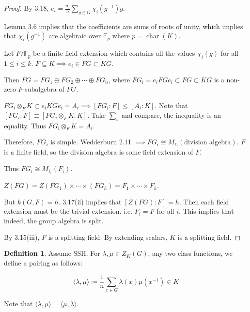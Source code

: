 \documentclass{article}
\theoremstyle{definition}
\newtheorem*{definition}{Definition}
\theoremstyle{plain}
\theoremstyle{remark}
\begin{document}
    \begin{proof}
        By 3.18, \(e_i = \frac{n_i}{n} \sum_{g\in G} \chi_i(g ^{-1}) g\).

        Lemma 3.6 implies that the coefficients are sums of roots of unity, which implies that \(\chi_i(g ^{-1})\) are algebraic over \(\mathbb{F}_p\) where \(p = \operatorname{char}(K)\).
        
        Let \(F / \mathbb{F}_p\) be a finite field extension which contains all the values \(\chi_i(g)\) for all \(1 \leq i \leq k\). \(F \subseteq K \implies e_i \in FG \subset KG\).

        Then \(FG = FG_1 \oplus FG_2 \oplus \cdots \oplus FG_n\), where \(FG_i = e_i FGe_i \subset FG \subset KG\) is a non-zero \(F\)-subalgebra of \(FG\).

        \(FG_i \otimes_F K \subset e_i KG e_i = A_i \implies [FG_i : F] \leq [A_i : K]\). Note that \([FG_i : F] \equiv  [FG_i \otimes_F K : K]\). Take \(\sum_{i}\) and compare, the inequality is an equality. Thus \(FG_i \otimes_F K = A_i\).
        
        Therefore, \(FG_i\) is simple. Wedderburn 2.11 \(\implies FG_i \cong M_{\ell_i}(\text{division algebra})\). \(F\) is a finite field, so the division algebra is some field extension of \(F\).

        Thus \(FG_i \cong M_{\ell_i}(F_i)\).

        \(Z(FG) = Z(FG_1) \times \cdots \times (FG_h) = F_1 \times \cdots \times F_h\).

        But \(k(G,F) = h\). 3.17(ii) implies that \([Z(FG):F] = h\). Then each field extension must be the trivial extension. i.e. \(F_i = F\) for all \(i\). This implies that indeed, the group algebra is split.

        By 3.15(iii), \(F\) is a splitting field. By extending scalars, \(K\) is a splitting field.
    \end{proof}

    \begin{definition}
        Assume SSH. For \(\lambda , \mu \in Z_K(G)\), any two class functions, we define a pairing as follows:

        \[
            \langle \lambda , \mu \rangle \coloneqq \frac{1}{n} \sum_{x\in G} \lambda(x) \mu(x ^{-1}) \in K
        \]

        Note that \(\langle \lambda , \mu \rangle = \langle \mu , \lambda \rangle \).
    \end{definition}
    
\end{document}
